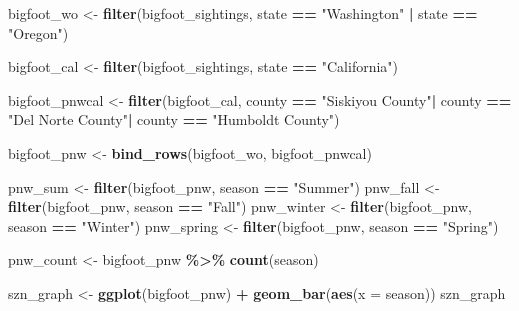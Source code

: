 \documentclass[
]{article}
\newenvironment{Shaded}{\begin{snugshade}}{\end{snugshade}}
\newcommand{\AttributeTok}[1]{\textcolor[rgb]{0.13,0.29,0.53}{#1}}
\newcommand{\FunctionTok}[1]{\textcolor[rgb]{0.13,0.29,0.53}{\textbf{#1}}}
\newcommand{\NormalTok}[1]{#1}
\newcommand{\OtherTok}[1]{\textcolor[rgb]{0.56,0.35,0.01}{#1}}
\newcommand{\SpecialCharTok}[1]{\textcolor[rgb]{0.81,0.36,0.00}{\textbf{#1}}}
\newcommand{\StringTok}[1]{\textcolor[rgb]{0.31,0.60,0.02}{#1}}
\begin{document}
\begin{Shaded}
\begin{Highlighting}[]
\NormalTok{bigfoot\_wo }\OtherTok{\textless{}{-}} \FunctionTok{filter}\NormalTok{(bigfoot\_sightings, state }\SpecialCharTok{==} \StringTok{"Washington"} \SpecialCharTok{|}\NormalTok{ state }\SpecialCharTok{==} \StringTok{"Oregon"}\NormalTok{) }

\NormalTok{bigfoot\_cal }\OtherTok{\textless{}{-}} \FunctionTok{filter}\NormalTok{(bigfoot\_sightings, state }\SpecialCharTok{==} \StringTok{"California"}\NormalTok{)}
                      
\NormalTok{bigfoot\_pnwcal }\OtherTok{\textless{}{-}} \FunctionTok{filter}\NormalTok{(bigfoot\_cal, county }\SpecialCharTok{==} \StringTok{"Siskiyou County"}\SpecialCharTok{|}\NormalTok{ county }\SpecialCharTok{==} \StringTok{"Del Norte County"}\SpecialCharTok{|}\NormalTok{ county }\SpecialCharTok{==} \StringTok{"Humboldt County"}\NormalTok{) }

\NormalTok{bigfoot\_pnw }\OtherTok{\textless{}{-}} \FunctionTok{bind\_rows}\NormalTok{(bigfoot\_wo, bigfoot\_pnwcal)}
\end{Highlighting}
\end{Shaded}

\begin{Shaded}
\begin{Highlighting}[]
\NormalTok{pnw\_sum }\OtherTok{\textless{}{-}} \FunctionTok{filter}\NormalTok{(bigfoot\_pnw, season }\SpecialCharTok{==} \StringTok{"Summer"}\NormalTok{)}
\NormalTok{pnw\_fall }\OtherTok{\textless{}{-}} \FunctionTok{filter}\NormalTok{(bigfoot\_pnw, season }\SpecialCharTok{==} \StringTok{"Fall"}\NormalTok{)}
\NormalTok{pnw\_winter }\OtherTok{\textless{}{-}} \FunctionTok{filter}\NormalTok{(bigfoot\_pnw, season }\SpecialCharTok{==} \StringTok{"Winter"}\NormalTok{)}
\NormalTok{pnw\_spring }\OtherTok{\textless{}{-}} \FunctionTok{filter}\NormalTok{(bigfoot\_pnw, season }\SpecialCharTok{==} \StringTok{"Spring"}\NormalTok{)}

\NormalTok{pnw\_count }\OtherTok{\textless{}{-}}\NormalTok{ bigfoot\_pnw }\SpecialCharTok{\%\textgreater{}\%} \FunctionTok{count}\NormalTok{(season)}

\NormalTok{szn\_graph }\OtherTok{\textless{}{-}} \FunctionTok{ggplot}\NormalTok{(bigfoot\_pnw) }\SpecialCharTok{+} \FunctionTok{geom\_bar}\NormalTok{(}\FunctionTok{aes}\NormalTok{(}\AttributeTok{x =}\NormalTok{ season))}
\NormalTok{szn\_graph}
\end{Highlighting}
\end{Shaded}
\end{document}
